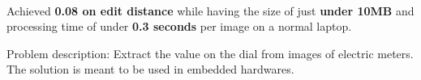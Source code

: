 \\
\begin{xitemize}
    \item Achieved \textbf{0.08 on edit distance} while having the size of just
    \textbf{under 10MB} and processing time of under \textbf{0.3 seconds} per image on a
    normal laptop.
    \item Problem description: Extract the value on the dial from images of electric
    meters. The solution is meant to be used in embedded hardwares.
\end{xitemize}




